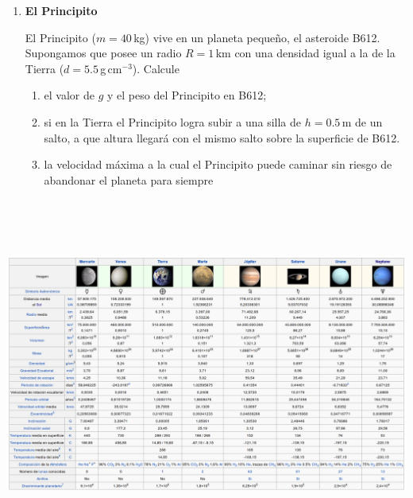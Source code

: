 \documentclass[a4paper,12pt]{article}
\begin{document}
\begin{enumerate}
\item {\bf{El Principito}}

El Principito ($m=40$\,kg) vive en un planeta pequeño, el asteroide B612. Supongamos que posee un radio $R = 1$\,km con una densidad igual a la de la Tierra ($d = 5.5$\,g\,cm$^{-3}$). Calcule 
\begin{enumerate}
\item el valor de $g$ y el peso del Principito en B612;
\item si en la Tierra el Principito logra subir a una silla de $h=0.5$\,m de un salto, a que altura llegará con el mismo salto sobre la superficie de B612. 
\item la velocidad máxima a la cual el Principito puede caminar sin riesgo de abandonar el planeta para siempre
\end{enumerate}
\end{enumerate}
\centering \includegraphics[height=11.6cm,angle=90]{planetas.png}
\end{document}
